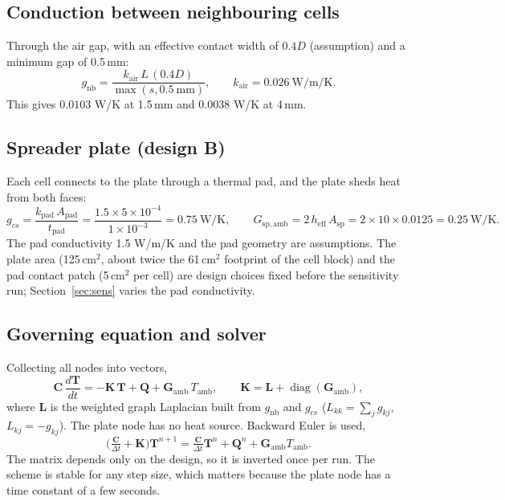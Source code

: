 \documentclass[11pt,a4paper]{article}
\begin{document}
\subsection{Conduction between neighbouring cells}
Through the air gap, with an effective contact width of $0.4D$ (assumption) and a minimum gap of 0.5\,mm:
\begin{equation}
g_{\mathrm{nb}}=\frac{k_{\mathrm{air}}\,L\,(0.4D)}{\max(s,0.5\ \mathrm{mm})},\qquad k_{\mathrm{air}}=0.026\ \mathrm{W/m/K}.
\end{equation}
This gives $0.0103$ W/K at 1.5\,mm and $0.0038$ W/K at 4\,mm.

\subsection{Spreader plate (design B)}
Each cell connects to the plate through a thermal pad, and the plate sheds heat from both faces:
\begin{equation}
g_{cs}=\frac{k_{\mathrm{pad}}\,A_{\mathrm{pad}}}{t_{\mathrm{pad}}}=\frac{1.5\times5\times10^{-4}}{1\times10^{-3}}=0.75\ \mathrm{W/K},\qquad
G_{\mathrm{sp,amb}}=2\,h_{\mathrm{eff}}\,A_{\mathrm{sp}}=2\times10\times0.0125=0.25\ \mathrm{W/K}.
\end{equation}
The pad conductivity 1.5 W/m/K and the pad geometry are assumptions. The plate area (125\,cm$^2$, about twice the 61\,cm$^2$ footprint of the cell block) and the pad contact patch (5\,cm$^2$ per cell) are design choices fixed before the sensitivity run; Section~\ref{sec:sens} varies the pad conductivity.

\subsection{Governing equation and solver}
Collecting all nodes into vectors,
\begin{equation}
\mathbf{C}\,\frac{d\mathbf{T}}{dt}=-\mathbf{K}\,\mathbf{T}+\mathbf{Q}+\mathbf{G}_{\mathrm{amb}}\,T_{\mathrm{amb}},\qquad
\mathbf{K}=\mathbf{L}+\operatorname{diag}(\mathbf{G}_{\mathrm{amb}}),
\end{equation}
where $\mathbf{L}$ is the weighted graph Laplacian built from $g_{\mathrm{nb}}$ and $g_{cs}$ ($L_{kk}=\sum_j g_{kj}$, $L_{kj}=-g_{kj}$). The plate node has no heat source. Backward Euler is used,
\begin{equation}
\Big(\tfrac{\mathbf{C}}{\Delta t}+\mathbf{K}\Big)\mathbf{T}^{n+1}=\tfrac{\mathbf{C}}{\Delta t}\mathbf{T}^{n}+\mathbf{Q}^{n}+\mathbf{G}_{\mathrm{amb}}T_{\mathrm{amb}} .
\end{equation}
The matrix depends only on the design, so it is inverted once per run. The scheme is stable for any step size, which matters because the plate node has a time constant of a few seconds.
\end{document}
